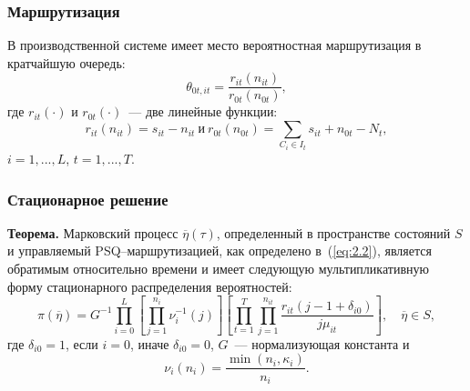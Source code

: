\begin{frame} \frametitle{Маршрутизация}
В производственной системе имеет место вероятностная маршрутизация в кратчайшую очередь:
\vfill
\begin{equation}
 \theta_{0t,it} = \frac{r_{it}(n_{it})} {r_{0t}(n_{0t})},
\label{eq:2.2}
\end{equation}
\vfill
где $r_{it}(\cdot)$ и $r_{0t}(\cdot)$~--- две линейные функции:
\vfill
\begin{equation*}
 r_{it}(n_{it}) = s_{it} - n_{it} ~ \text{и} ~ r_{0t}(n_{0t}) = \sum_{C_i \in I_t} s_{it} + n_{0t} - N_t,
\end{equation*}
$i=1,...,L$, $t=1,...,T$.
\vfill
\end{frame}


\begin{frame} \frametitle{Стационарное решение}
\textbf{Теорема\footnotemark.} Марковский процесс $\overline{\eta}(\tau)$, определенный в пространстве состояний $S$ и управляемый PSQ--маршрутизацией, как определено в~(\ref{eq:2.2}), является обратимым относительно времени и имеет следующую мультипликативную форму стационарного распределения вероятностей:
 \begin{equation}
  \pi(\overline{\eta}) = G^{-1} \prod_{i=0}^L \left[ \prod_{j=1}^{n_i} \nu_i^{-1} (j) \right]
  \left[ \prod_{t=1}^T \prod_{j=1}^{n_{it}} \frac{r_{it} (j - 1 + \delta_{i0})}{j\mu_{it}} \right], \quad \overline{\eta} \in S ,
  \label{eq:2.4}
 \end{equation}
где $\delta_{i0}=1$, если $i=0$, иначе $\delta_{i0}=0$, $G$~--- нормализующая константа и
\begin{equation*}
\nu_i(n_i) = \frac{\min(n_i, \kappa_i)}{n_i} .
\end{equation*}
\end{frame}


